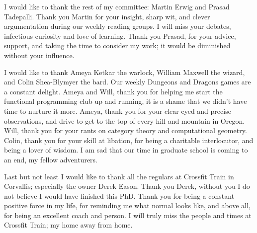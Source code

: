 I would like to thank the rest of my committee: Martin Erwig and Prasad
Tadepalli. Thank you Martin for your insight, sharp wit, and clever
argumentation during our weekly reading groups. I will miss your debates,
infectious curiosity and love of learning. Thank you Prasad, for your advice,
support, and taking the time to consider my work; it would be diminished without
your influence.

I would like to thank Ameya Ketkar the warlock, William Maxwell the wizard, and
Colin Shea-Blymyer the bard. Our weekly Dungeons and Dragons games are a
constant delight. Ameya and Will, thank you for helping me start the functional
programming club up and running, it is a shame that we didn't have time to
nurture it more. Ameya, thank you for your clear eyed and precise observations,
and drive to get to the top of every hill and mountain in Oregon. Will, thank
you for your rants on category theory and computational geometry. Colin, thank
you for your skill at libation, for being a charitable interlocutor, and being a
lover of wisdom. I am sad that our time in graduate school is coming to an end,
my fellow adventurers.

Last but not least I would like to thank all the regulars at Crossfit Train in
Corvallis; especially the owner Derek Eason. Thank you Derek, without you I do
not believe I would have finished this PhD. Thank you for being a constant
positive force in my life, for reminding me what normal looks like, and above
all, for being an excellent coach and person. I will truly miss the people and
times at Crossfit Train; my home away from home.


